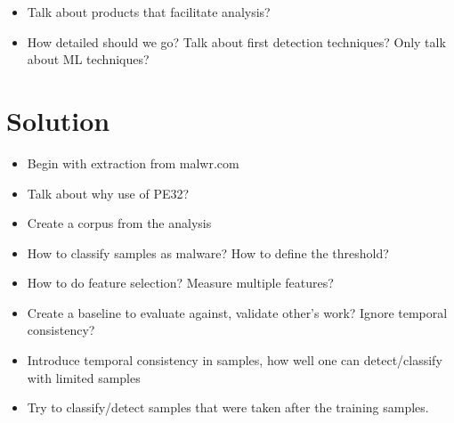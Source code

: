 \documentclass{llncs}
\begin{document}
\clearpage

\begin{itemize}
	\item Talk about products that facilitate analysis?
	\item How detailed should we go? Talk about first detection techniques? Only talk about ML techniques?
\end{itemize}

% 






\section{Solution}\label{sec:solution}

\begin{itemize}
	\item Begin with extraction from malwr.com
	\item Talk about why use of PE32?
	\item Create a corpus from the analysis
	\item How to classify samples as malware? How to define the threshold?
	\item How to do feature selection? Measure multiple features?
	\item Create a baseline to evaluate against, validate other's work? Ignore temporal consistency?
	\item Introduce temporal consistency in samples, how well one can detect/classify with limited samples
	\item Try to classify/detect samples that were taken after the training samples.
\end{itemize}
\end{document}
